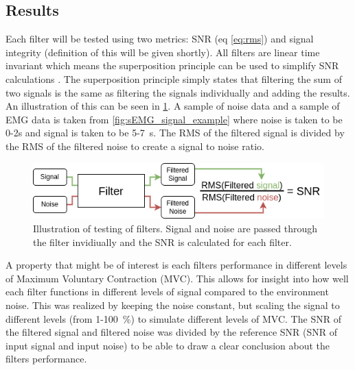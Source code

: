 \subsection{Results}
Each filter will be tested using two metrics: SNR (eq \ref{eq:rms}) and signal integrity (definition of this will be given shortly). All filters are linear time invariant which means the superposition principle can be used to simplify SNR calculations \cite{linear_systems_theory}. The superposition principle simply states that filtering the sum of two signals is the same as filtering the signals individually and adding the results. An illustration of this can be seen in \ref{fig:filter_process}. A sample of noise data and a sample of EMG data is taken from \ref{fig:sEMG_signal_example} where noise is taken to be 0-2s and signal is taken to be 5-\SI{7}{\second}. The RMS of the filtered signal is divided by the RMS of the filtered noise to create a signal to noise ratio.

\begin{figure}[h!t]
	\begin{center}
		\includegraphics[width=1.0\columnwidth]{images/filter_process.png}
	\end{center}
	\caption{Illustration of testing of filters. Signal and noise are passed through the filter invidiually and the SNR is calculated for each filter.}
	\label{fig:filter_process}
\end{figure}

A property that might be of interest is each filters performance in different levels of Maximum Voluntary Contraction (MVC). This allows for insight into how well each filter functions in different levels of signal compared to the environment noise. This was realized by keeping the noise constant, but scaling the signal to different levels (from 1-\SI{100}{\percent}) to simulate different levels of MVC. The SNR of the filtered signal and filtered noise was divided by the reference SNR (SNR of input signal and input noise) to be able to draw a clear conclusion about the filters performance.


